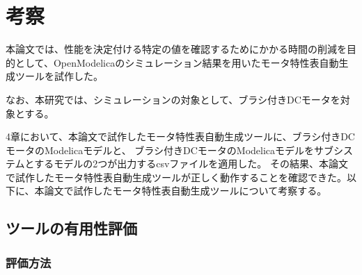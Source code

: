 \chapter{考察}\label{cha:Discussion}
本論文では、性能を決定付ける特定の値を確認するためにかかる時間の削減を目的として、OpenModelicaのシミュレーション結果を用いたモータ特性表自動生成ツールを試作した。

なお、本研究では、シミュレーションの対象として、ブラシ付きDCモータを対象とする。

4章において、本論文で試作したモータ特性表自動生成ツールに、ブラシ付きDCモータのModelicaモデルと、
ブラシ付きDCモータのModelicaモデルをサブシステムとするモデルの2つが出力するcsvファイルを適用した。
その結果、本論文で試作したモータ特性表自動生成ツールが正しく動作することを確認できた。以下に、本論文で試作したモータ特性表自動生成ツールについて考察する。
\section{ツールの有用性評価}

\subsection{評価方法}





